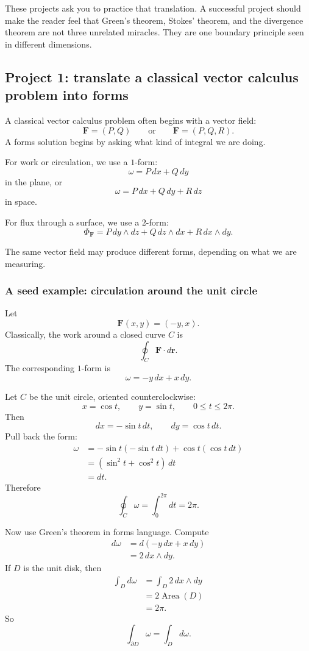 These projects ask you to practice that translation.  A successful project should make
the reader feel that Green's theorem, Stokes' theorem, and the divergence theorem are
not three unrelated miracles.  They are one boundary principle seen in different
dimensions.

\subsection{Project 1: translate a classical vector calculus problem into forms}

A classical vector calculus problem often begins with a vector field:
\[
    \mathbf F=(P,Q)
    \qquad\text{or}\qquad
    \mathbf F=(P,Q,R).
\]
A forms solution begins by asking what kind of integral we are doing.

For work or circulation, we use a \(1\)-form:
\[
\boxed{
    \omega=P\,dx+Q\,dy
}
\]
in the plane, or
\[
\boxed{
    \omega=P\,dx+Q\,dy+R\,dz
}
\]
in space.

For flux through a surface, we use a \(2\)-form:
\[
\boxed{
    \Phi_{\mathbf F}
    =
    P\,dy\wedge dz
    +
    Q\,dz\wedge dx
    +
    R\,dx\wedge dy.
}
\]

The same vector field may produce different forms, depending on what we are measuring.

\subsubsection*{A seed example: circulation around the unit circle}

Let
\[
    \mathbf F(x,y)=(-y,x).
\]
Classically, the work around a closed curve \(C\) is
\[
    \oint_C \mathbf F\cdot d\mathbf r.
\]
The corresponding \(1\)-form is
\[
\boxed{
    \omega=-y\,dx+x\,dy.
}
\]

Let \(C\) be the unit circle, oriented counterclockwise:
\[
    x=\cos t,\qquad y=\sin t,\qquad 0\le t\le2\pi.
\]
Then
\[
    dx=-\sin t\,dt,
    \qquad
    dy=\cos t\,dt.
\]
Pull back the form:
\[
\begin{aligned}
    \omega
    &=
    -\sin t(-\sin t\,dt)+\cos t(\cos t\,dt)\\
    &=
    (\sin^2t+\cos^2t)\,dt\\
    &=
    dt.
\end{aligned}
\]
Therefore
\[
\boxed{
    \oint_C\omega=\int_0^{2\pi}dt=2\pi.
}
\]

Now use Green's theorem in forms language.  Compute
\[
\begin{aligned}
    d\omega
    &=
    d(-y\,dx+x\,dy)\\
    &=
    2\,dx\wedge dy.
\end{aligned}
\]
If \(D\) is the unit disk, then
\[
\begin{aligned}
    \int_D d\omega
    &=
    \int_D 2\,dx\wedge dy\\
    &=
    2\operatorname{Area}(D)\\
    &=
    2\pi.
\end{aligned}
\]
So
\[
\boxed{
    \int_{\partial D}\omega=\int_D d\omega.
}
\]

